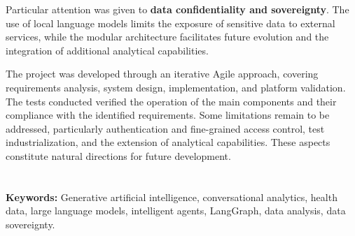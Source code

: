 Particular attention was given to \textbf{data confidentiality and sovereignty}. The use of local language models limits the exposure of sensitive data to external services, while the modular architecture facilitates future evolution and the integration of additional analytical capabilities.

The project was developed through an iterative Agile approach, covering requirements analysis, system design, implementation, and platform validation. The tests conducted verified the operation of the main components and their compliance with the identified requirements. Some limitations remain to be addressed, particularly authentication and fine-grained access control, test industrialization, and the extension of analytical capabilities. These aspects constitute natural directions for future development.
\\ 
\\ 
\\ 
\textbf{Keywords:} Generative artificial intelligence, conversational analytics, health data, large language models, intelligent agents, LangGraph, data analysis, data sovereignty.







